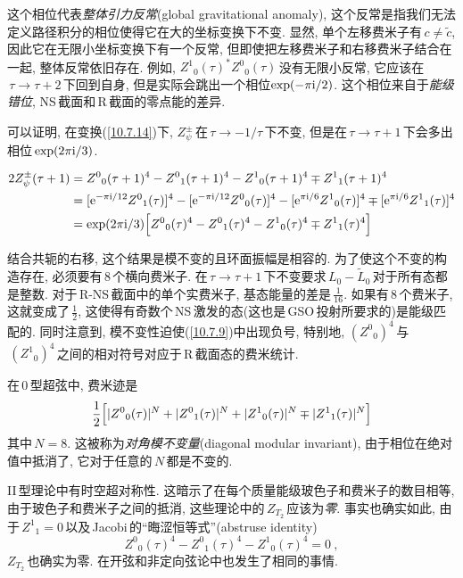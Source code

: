 这个相位代表{\emph{整体引力反常}}(global gravitational anomaly), 这个反常是指我们无法定义路径积分的相位使得它在大的坐标变换下不变. 显然, 单个左移费米子有$\,c\neq\tilde{c}$, 因此它在无限小坐标变换下有一个反常, 但即使把左移费米子和右移费米子结合在一起, 整体反常依旧存在. 例如, $Z^{1}{}_{0}(\tau)^{\ast}Z^{0}{}_{0}(\tau)\,$没有无限小反常, 它应该在$\,\tau\to\tau+2\,$下回到自身, 但是实际会跳出一个相位$\exp(-\pi\mathrm{i}/2)$. 这个相位来自于{\emph{能级错位}}, NS\,截面和\,R\,截面的零点能的差异.

可以证明, 在变换(\ref{10.7.14})下, $Z_{\psi}^{\pm}\,$在$\,\tau\to-1/\tau\,$下不变, 但是在$\,\tau\to\tau+1\,$下会多出相位$\,\exp(2\pi\mathrm{i}/3)$.
\begin{tcolorbox}
\begin{align*}
     2Z_{\psi}^{\pm}(\tau+1) &=Z^{0}{}_{0}(\tau+1)^{4}-Z^{0}{}_{1}(\tau+1)^{4}-Z^{1}{}_{0}(\tau+1)^{4}\mp Z^{1}{}_{1}(\tau+1)^{4} \\
     &= [\mathrm{e}^{-\pi\mathrm{i}/12}Z^{0}{}_{1}(\tau)]^{4}-[\mathrm{e}^{-\pi\mathrm{i}/12}Z^{0}{}_{0}(\tau)]^{4}
     -[\mathrm{e}^{\pi\mathrm{i}/6}Z^{1}{}_{0}(\tau)]^{4}\mp[\mathrm{e}^{\pi\mathrm{i}/6}Z^{1}{}_{1}(\tau)]^{4} \\
     &=\exp(2\pi\mathrm{i}/3)\Bigl[Z^{0}{}_{0}(\tau)^{4}-Z^{0}{}_{1}(\tau)^{4}-Z^{1}{}_{0}(\tau)^{4}\mp Z^{1}{}_{1}(\tau)^{4}\Bigr]
\end{align*}
\end{tcolorbox}
\noindent 结合共轭的右移, 这个结果是模不变的且环面振幅是相容的. 为了使这个不变的构造存在, 必须要有\,8\,个横向费米子. 在$\,\tau\to\tau+1\,$下不变要求$\,L_{0}-\tilde{L}_{0}\,$对于所有态都是整数. 对于\,R-NS\,截面中的单个实费米子, 基态能量的差是$\,\frac{1}{16}$. 如果有\,8\,个费米子, 这就变成了$\,\frac{1}{2}$, 这使得有奇数个\,NS\,激发的态(这也是\,GSO\,投射所要求的)是能级匹配的. 同时注意到, 模不变性迫使(\ref{10.7.9})中出现负号, 特别地, $(Z^{0}{}_{0})^{4}\,$与$\,(Z^{1}{}_{0})^{4}\,$之间的相对符号对应于\,R\,截面态的费米统计.


在\,0\,型超弦中, 费米迹是
\begin{equation}
    \frac{1}{2} \Bigl[\lvert Z^{0}{}_{0}(\tau)\rvert^{N}+\lvert Z^{0}{}_{1}(\tau)\rvert^{N}+\lvert Z^{1}{}_{0}(\tau)\rvert^{N}\mp \lvert Z^{1}{}_{1}(\tau)\rvert^{N} \Bigr] \label{10.7.15}
\end{equation}
其中$\,N=8$. 这被称为{\emph{对角模不变量}}(diagonal modular invariant), 由于相位在绝对值中抵消了, 它对于任意的$\,N\,$都是不变的.

II\,型理论中有时空超对称性. 这暗示了在每个质量能级玻色子和费米子的数目相等, 由于玻色子和费米子之间的抵消, 这些理论中的$\,Z_{T_{2}}\,$应该为{\emph{零}}. 事实也确实如此, 由于$\,Z^{1}{}_{1}=0\,$以及\,Jacobi\,的``晦涩恒等式''(abstruse identity)
\begin{equation}
    Z^{0}{}_{0}(\tau)^{4}-Z^{0}{}_{1}(\tau)^{4}-Z^{1}{}_{0}(\tau)^{4}=0 \:,\label{10.7.16}
\end{equation}
$Z_{T_{2}}\,$也确实为零. 在开弦和非定向弦论中也发生了相同的事情.


